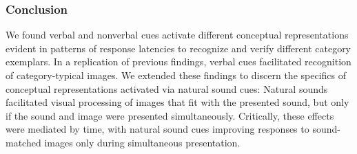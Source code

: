 \documentclass[12pt, titlepage]{article}
\begin{document}
\subsubsection*{Conclusion}
We found verbal and nonverbal cues activate different conceptual representations evident in patterns of response latencies to recognize and verify different category exemplars. In a replication of previous findings, verbal cues facilitated recognition of category-typical images. We extended these findings to discern the specifics of conceptual representations activated via natural sound cues: Natural sounds facilitated visual processing of images that fit with the presented sound, but only if the sound and image were presented simultaneously. Critically, these effects were mediated by time, with natural sound cues improving responses to sound-matched images only during simultaneous presentation.



\end{document}
